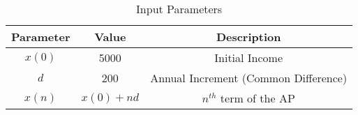 \begin{table}[h!]
    \centering
    \caption{Input Parameters}
    \label{tab:1}
    \begin{tabular}{ | c | c | c | }
        \hline
        Parameter & Value & Description \\
        \hline
        $x(0)$ & 5000 & Initial Income \\
        \hline
        $d$ & 200 & Annual Increment (Common Difference) \\
        \hline
        $x(n)$ & $x(0) + nd$ & $n^{th}$ term of the AP \\
        \hline
    \end{tabular}
\end{table}